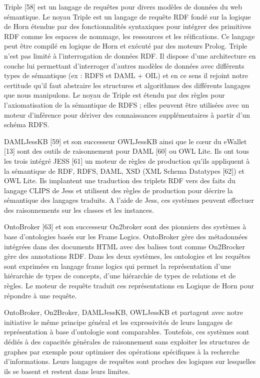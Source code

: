 Triple [58] est un langage de requêtes pour divers modèles de données du web sémantique. Le noyau Triple est un langage de requête RDF fondé sur la logique de Horn étendue par des fonctionnalités syntaxiques pour intégrer des primitives RDF comme les espaces de nommage, les ressources et les réifications. Ce langage peut être compilé en logique de Horn et exécuté par des moteurs Prolog. Triple n'est pas limité à l'interrogation de données RDF. Il dispose d'une architecture en couche lui permettant d'interroger d’autres modèles de données avec différents types de sémantique (ex : RDFS et DAML + OIL) et en ce sens il rejoint notre certitude qu’il faut abstraire les structures et algorithmes des différents langages que nous manipulons. Le noyau de Triple est étendu par des règles pour l’axiomatisation de la sémantique de RDFS ; elles peuvent être utilisées avec un moteur d'inférence pour dériver des connaissances supplémentaires à partir d'un schéma RDFS.

DAMLJessKB [59] et son successeur OWLJessKB ainsi que le cœur du eWallet [13] sont des outils de raisonnement pour DAML [60] ou OWL Lite. Ils ont tous les trois intégré JESS [61] un moteur de règles de production qu’ils appliquent à la sémantique de RDF, RDFS, DAML, XSD (XML Schema Datatypes [62]) et OWL Lite. Ils implantent une traduction des triplets RDF vers des faits du langage CLIPS de Jess et utilisent des règles de production pour décrire la sémantique des langages traduits. A l'aide de Jess, ces systèmes peuvent effectuer des raisonnements sur les classes et les instances.

OntoBroker [63] et son successeur On2broker sont des pionniers des systèmes à base d'ontologies basés sur les Frame Logics. OntoBroker gère des métadonnées intégrées dans des documents HTML avec des balises tout comme On2Brocker gère des annotations RDF. Dans les deux systèmes, les ontologies et les requêtes sont exprimées en langage frame logics qui permet la représentation d'une hiérarchie de types de concepts, d'une hiérarchie de types de relations et de règles. Le moteur de requête traduit ces représentations en Logique de Horn pour répondre à une requête.

OntoBroker, On2Broker, DAMLJessKB, OWLJessKB et partagent avec notre initiative le même principe général et les expressivités de leurs langages de représentation à base d’ontologie sont comparables. Toutefois, ces systèmes sont dédiés à des capacités générales de raisonnement sans exploiter les structures de graphes par exemple pour optimiser des opérations spécifiques à la recherche d'informations. Leurs langages de requêtes sont proches des logiques sur lesquelles ils se basent et restent dans leurs limites.

